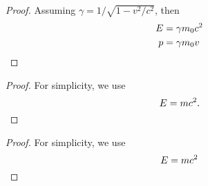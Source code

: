 \documentclass[12pt]{ctexrep}
\begin{document}
\begin{proof}
Assuming $\gamma = 1/\sqrt{1-v^2/c^2}$, then
\begin{align*}
E &= \gamma m_0 c^2 \\
p &= \gamma m_0v \qedhere
\end{align*}
\end{proof}

\begin{proof}
For simplicity, we use 
\begin{equation}
E=mc^2.\qedhere
\end{equation}
\end{proof}


\renewcommand{\qedsymbol}{\rule{1ex}{1.5ex}}
\begin{proof}
For simplicity, we use
\[
E=mc^2 \qedhere  
\]
\end{proof}

\end{document}
